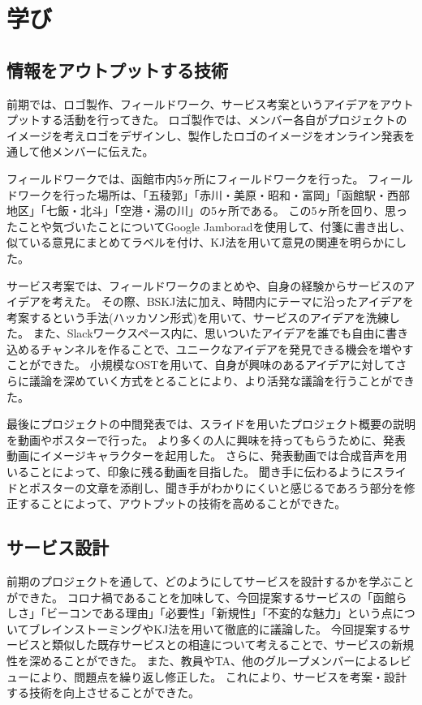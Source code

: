 \chapter{学び}

\section{情報をアウトプットする技術}
前期では、ロゴ製作、フィールドワーク、サービス考案というアイデアをアウトプットする活動を行ってきた。
ロゴ製作では、メンバー各自がプロジェクトのイメージを考えロゴをデザインし、製作したロゴのイメージをオンライン発表を通して他メンバーに伝えた。

フィールドワークでは、函館市内5ヶ所にフィールドワークを行った。
フィールドワークを行った場所は、「五稜郭」「赤川・美原・昭和・富岡」「函館駅・西部地区」「七飯・北斗」「空港・湯の川」の5ヶ所である。
この5ヶ所を回り、思ったことや気づいたことについてGoogle Jamboradを使用して、付箋に書き出し、似ている意見にまとめてラベルを付け、KJ法を用いて意見の関連を明らかにした。

サービス考案では、フィールドワークのまとめや、自身の経験からサービスのアイデアを考えた。
その際、BSKJ法に加え、時間内にテーマに沿ったアイデアを考案するという手法(ハッカソン形式)を用いて、サービスのアイデアを洗練した。
また、Slackワークスペース内に、思いついたアイデアを誰でも自由に書き込めるチャンネルを作ることで、ユニークなアイデアを発見できる機会を増やすことができた。
小規模なOSTを用いて、自身が興味のあるアイデアに対してさらに議論を深めていく方式をとることにより、より活発な議論を行うことができた。

最後にプロジェクトの中間発表では、スライドを用いたプロジェクト概要の説明を動画やポスターで行った。
より多くの人に興味を持ってもらうために、発表動画にイメージキャラクターを起用した。
さらに、発表動画では合成音声を用いることによって、印象に残る動画を目指した。
聞き手に伝わるようにスライドとポスターの文章を添削し、聞き手がわかりにくいと感じるであろう部分を修正することによって、アウトプットの技術を高めることができた。

\section{サービス設計}
前期のプロジェクトを通して、どのようにしてサービスを設計するかを学ぶことができた。
コロナ禍であることを加味して、今回提案するサービスの「函館らしさ」「ビーコンである理由」「必要性」「新規性」「不変的な魅力」という点についてブレインストーミングやKJ法を用いて徹底的に議論した。
今回提案するサービスと類似した既存サービスとの相違について考えることで、サービスの新規性を深めることができた。
また、教員やTA、他のグループメンバーによるレビューにより、問題点を繰り返し修正した。
これにより、サービスを考案・設計する技術を向上させることができた。

